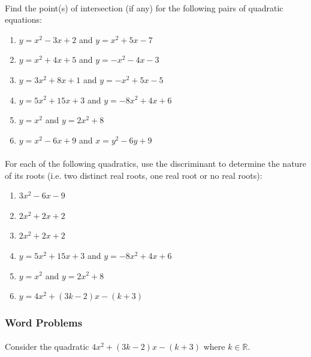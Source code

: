 \documentclass[12pt, a4paper, titlepage, twoside]{article}
\newcommand*{\R}{\mathbb{R}}
\begin{document}
	\paragraph{}
	 Find the point(s) of intersection (if any) for the following pairs of quadratic equations:
	
	\begin{multicols}{2}
		\begin{enumerate}[label=\textbf{(\alph*)}]
			\item $y = x^2-3x+2$ and $y = x^2+5x-7$
			\item $y = x^2+4x+5$ and $y = -x^2-4x-3$
			\item $y = 3x^2+8x+1$ and $y = -x^2+5x-5$
			\item $y = 5x^2+15x+3$ and $y = -8x^2+4x+6$
			\item $y = x^2$ and $y = 2x^2 + 8$
			\item $y = x^2-6x+9$ and $x = y^2-6y+9$
		\end{enumerate}
	\end{multicols}
	
	\paragraph{}
	 For each of the following quadratics, use the discriminant to determine the nature of its roots
	(i.e. two distinct real roots, one real root or no real roots):
	
	\begin{multicols}{2}
		\begin{enumerate}[label=\textbf{(\alph*)}]
			\item $3x^2-6x-9$
			\item $2x^2 + 2x + 2$
			\item $2x^2 + 2x + 2$
			\item $y = 5x^2+15x+3$ and $y = -8x^2+4x+6$
			\item $y = x^2$ and $y = 2x^2 + 8$
			\item $y = 4x^2 + (3k-2)x - (k+3)$
		\end{enumerate}
	\end{multicols}
	
	\subsubsection*{Word Problems}	
	
	\paragraph{}
	 Consider the quadratic $4x^2 + (3k-2)x - (k+3)$ where $k \in \R$.
	
\end{document}
